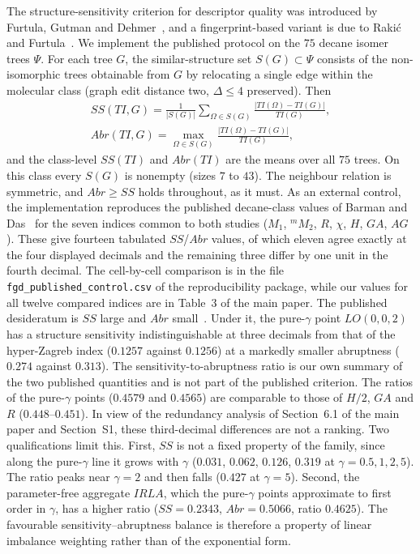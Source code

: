 \documentclass[a5paper, 10pt]{article}
\theoremstyle{plain}
\theoremstyle{remark}
\theoremstyle{definition}
\begin{document}
The structure-sensitivity criterion for descriptor quality was
introduced by Furtula, Gutman and
Dehmer~\cite{FurtulaGutmanDehmer2013SS}, and a fingerprint-based
variant is due to Raki\'c and Furtula~\cite{RakicFurtula2019SS}. We
implement the published protocol on the $75$ decane isomer trees
$\Psi$. For each tree $G$, the similar-structure set
$S(G) \subset \Psi$ consists of the non-isomorphic trees obtainable
from $G$ by relocating a single edge within the molecular class
(graph edit distance two, $\Delta \le 4$ preserved). Then
\begin{gather*}
SS(TI, G) = \frac{1}{|S(G)|} \sum_{\Omega \in S(G)}
\frac{|TI(\Omega) - TI(G)|}{TI(G)},\\
Abr(TI, G) = \max_{\Omega \in S(G)}
\frac{|TI(\Omega) - TI(G)|}{TI(G)},
\end{gather*}
and the class-level $SS(TI)$ and $Abr(TI)$ are the means over all
$75$ trees. On this class every $S(G)$ is nonempty (sizes $7$ to
$43$). The neighbour relation is symmetric, and $Abr \ge SS$ holds
throughout, as it must. As an external control, the implementation
reproduces the published decane-class values of Barman and
Das~\cite{BarmanDas2026HSO} for the seven indices common to both
studies ($M_1$, ${}^{m}\!M_2$, $R$, $\chi$, $H$, $GA$, $AG$). These
give fourteen tabulated $SS$/$Abr$ values, of which eleven agree exactly
at the four displayed decimals and the remaining three differ by one
unit in the fourth decimal. The cell-by-cell comparison is in the file
\texttt{fgd\_published\_control.csv} of the reproducibility package,
while our values for all twelve compared indices are in
Table~3 of the main paper. The published desideratum is $SS$ large
and $Abr$ small~\cite{FurtulaGutmanDehmer2013SS}. Under it, the
pure-$\gamma$ point $LO(0,0,2)$ has a structure sensitivity
indistinguishable at three decimals from that of the hyper-Zagreb
index ($0.1257$ against $0.1256$) at a
markedly smaller abruptness ($0.274$ against $0.313$). The
sensitivity-to-abruptness ratio is our own summary of the two published
quantities and is not part of the published criterion. The ratios of the
pure-$\gamma$ points
($0.4579$ and $0.4565$) are comparable to those of $H/2$, $GA$ and
$R$ ($0.448$--$0.451$). In view of the redundancy analysis of
Section~6.1 of the main paper and Section~S1, these third-decimal
differences are not a ranking. Two qualifications limit this. First,
$SS$ is not a fixed property of the family, since along the pure-$\gamma$
line it grows with $\gamma$ ($0.031$, $0.062$, $0.126$, $0.319$ at
$\gamma = 0.5, 1, 2, 5$). The ratio peaks near $\gamma = 2$ and then
falls ($0.427$ at $\gamma = 5$). Second, the parameter-free aggregate
$IRLA$, which the pure-$\gamma$ points approximate to first order in
$\gamma$, has a higher ratio ($SS = 0.2343$, $Abr = 0.5066$, ratio
$0.4625$). The favourable sensitivity--abruptness balance is
therefore a property of linear imbalance weighting rather than of the
exponential form.
\end{document}
